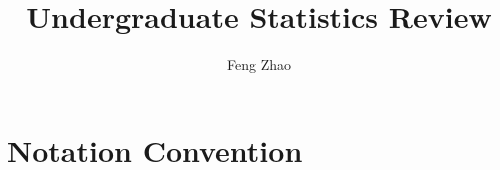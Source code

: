 \documentclass{book}
\title{Undergraduate Statistics Review}
\author{Feng Zhao}
\begin{document}
\maketitle
\chapter{Notation Convention}

\end{document}
